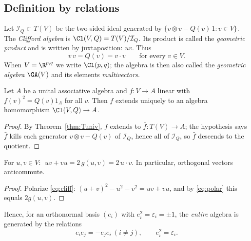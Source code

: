 \subsection{Definition by relations}

\begin{definition}
Let $\mathcal I_Q\subset T(V)$ be the two-sided ideal generated by $\{v\otimes v-Q(v)\,1: v\in V\}$. The
\emph{Clifford algebra} is $\Cl(V,Q)=T(V)/\mathcal I_Q$. Its product is called the
\emph{geometric product} and is written by juxtaposition: $uv$. Thus
\begin{equation}\label{eq:cliff}
 v\,v=Q(v)=v\cdot v\qquad\text{for every }v\in V.
\end{equation}
When $V=\R^{p,q}$ we write $\Cl(p,q)$; the algebra is then also called the \emph{geometric algebra} $\GA(V)$ and its elements \emph{multivectors}.
\end{definition}

\begin{theorem}\label{thm:cliffuniv}
Let $A$ be a unital associative algebra and $f:V\to A$ linear with $f(v)^2=Q(v)1_A$ for all $v$. Then $f$ extends uniquely to an algebra homomorphism $\Cl(V,Q)\to A$.
\end{theorem}
\begin{proof}
By Theorem~\ref{thm:Tuniv}, $f$ extends to $\bar f:T(V)\to A$; the hypothesis says $\bar f$ kills each generator $v\otimes v-Q(v)$ of $\mathcal I_Q$, hence all of $\mathcal I_Q$, so $\bar f$ descends to the quotient.
\end{proof}

\begin{proposition}\label{prop:fund}
For $u,v\in V$: $\;uv+vu=2\,g(u,v)=2\,u\cdot v$. In particular, orthogonal vectors anticommute.
\end{proposition}
\begin{proof}
Polarize \eqref{eq:cliff}: $(u+v)^2-u^2-v^2=uv+vu$, and by \eqref{eq:polar} this equals $2g(u,v)$.
\end{proof}

Hence, for an orthonormal basis $(e_i)$ with $e_i^2=\varepsilon_i=\pm1$, the \emph{entire} algebra is generated by the relations
\[
 e_ie_j=-e_je_i\ (i\neq j),\qquad e_i^2=\varepsilon_i .
\]
